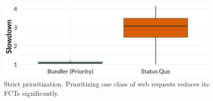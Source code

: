 \begin{figure}
    \centering
\begin{knitrout}
\color{fgcolor}
\includegraphics[width=\maxwidth]{figure/robust:strict-prio-1} 

\end{knitrout}
    \caption{Strict prioritization. Prioritizing one class of web requests reduces its FCTs significantly.}
    \label{fig:eval:strict-prio}
\end{figure}
